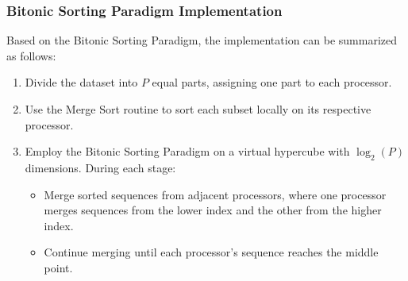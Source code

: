 \documentclass[article,12pt,conference]{ieeeconf} %
\begin{document}
\subsubsection{Bitonic Sorting Paradigm Implementation}
Based on the Bitonic Sorting Paradigm, the implementation can be summarized as follows:
\begin{enumerate}
    \item Divide the dataset into $P$ equal parts, assigning one part to each processor.
    \item Use the Merge Sort routine to sort each subset locally on its respective processor.
    \item Employ the Bitonic Sorting Paradigm on a virtual hypercube with  $\log_2(P)$ dimensions.
    During each stage:
    \begin{itemize}
        \item Merge sorted sequences from adjacent processors, where one processor merges sequences from the lower index and the other from the higher index.
        \item Continue merging until each processor's sequence reaches the middle point. 
    \end{itemize}
\end{enumerate}
\end{document}
